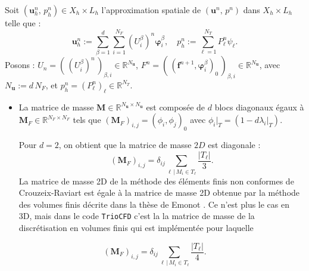 Soit $(\mathbf{u}{}_{h}^{n},\,p_{h}^{n})\in X_{h}\times L_{h}$ l'approximation
spatiale de $(\mathbf{u}^{n},\,p^{n})$ dans $X_{h}\times L_{h}$
telle que : 
\[
\mathbf{u}_{h}^{n}:=\sum_{\beta=1}^{d}\sum_{i=1}^{N_{F}}\left(U_{i}^{\beta}\right)^{n}\boldsymbol{\varphi}{}_{i}^{\beta},\quad p_{h}^{n}:=\sum_{\ell=1}^{N_{T}}P_{\ell}^{n}\psi_{\ell}.
\]
Posons : $U_{n}=(\,(U_{i}^{\beta})^{n}\,)_{\beta,i}\in\mathbb{R}^{N_{\mathbf{u}}}$,
$F^{n}=(\,(\mathbf{f}^{n+1},\boldsymbol{\varphi}_{i}^{\beta})_{0}\,)_{\beta,i}\in\mathbb{R}^{N_{\mathbf{u}}}$,
avec $N_{\mathbf{u}}:=d\,N_{F}$, et $p_{h}^{n}=(P_{\ell}^{n})_{\ell}\in\mathbb{R}^{N_{T}}$. 
\begin{itemize}
\item La matrice de masse $\mathbf{M}\in\mathbb{R}^{N_{\mathbf{u}}\times N_{\mathbf{u}}}$
est compos\'ee de $d$ blocs diagonaux \'egaux \`a $\mathbf{M}_{F}\in\mathbb{R}^{N_{F}\times N_{F}}$
tels que $\left(\mathbf{M}_{F}\right)_{i,j}=(\phi_{i},\phi_{j})_{0}$
avec $\phi_{i}|_{T}=\left(1-d\lambda_{i}|_{T}\right)$. 


Pour $d=2$, on obtient que la matrice de masse $2D$ est diagonale
: 
\[
\left(\mathbf{M}_{F}\right)_{i,j}=\delta_{ij}\sum_{\ell\,|\,M_{i}\in T_{\ell}}\frac{|T_{\ell}|}{3}.
\]
La matrice de masse 2D de la m\'ethode des \'el\'ements finis non conformes
de Crouzeix-Raviart est \'egale \`a la matrice de masse 2D obtenue par
la m\'ethode des volumes finis d\'ecrite dans la th\`ese de Emonot \cite{Emon92}.
Ce n'est plus le cas en 3D, mais dans le code \texttt{TrioCFD} c'est
la la matrice de masse de la discr\'etisation en volumes finis qui est
impl\'ement\'ee pour laquelle

\end{itemize}
\[
\left(\mathbf{M}_{F}\right)_{i,j}=\delta_{ij}\sum_{\ell\,|\,M_{i}\in T_{\ell}}\frac{|T_{\ell}|}{4}.
\]

